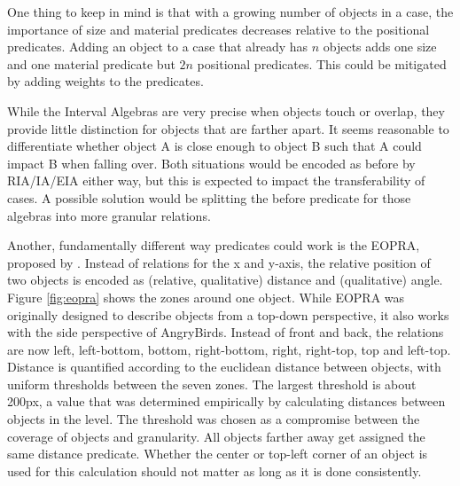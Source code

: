 One thing to keep in mind is that with a growing number of objects in a case, the importance of size and material predicates decreases relative to the positional predicates. Adding an object to a case that already has $n$ objects adds one size and one material predicate but $2n$ positional predicates. This could be mitigated by adding weights to the predicates.

While the Interval Algebras are very precise when objects touch or overlap, they provide little distinction for objects that are farther apart. It seems reasonable to differentiate whether object A is close enough to object B such that A could impact B when falling over. 
Both situations would be encoded as before by RIA/IA/EIA either way, but this is expected to impact the transferability of cases.
A possible solution would be splitting the before predicate for those algebras into more granular relations.

Another, fundamentally different way predicates could work is the \ac{EOPRA}, proposed by \cite{EOPRA-Perico2016CollaborativeCO}. Instead of relations for the x and y-axis, the relative position of two objects is encoded as (relative, qualitative) distance and (qualitative) angle.
Figure \ref{fig:eopra} shows the zones around one object. While \ac{EOPRA} was originally designed to describe objects from a top-down perspective, it also works with the side perspective of AngryBirds.
Instead of front and back, the relations are now left, left-bottom, bottom, right-bottom, right, right-top, top and left-top.
Distance is quantified according to the euclidean distance between objects, with uniform thresholds between the seven zones. The largest threshold is about 200px, a value that was determined empirically by calculating distances between objects in the level. The threshold was chosen as a compromise between the coverage of objects and granularity.
All objects farther away get assigned the same distance predicate. Whether the center or top-left corner of an object is used for this calculation should not matter as long as it is done consistently.


